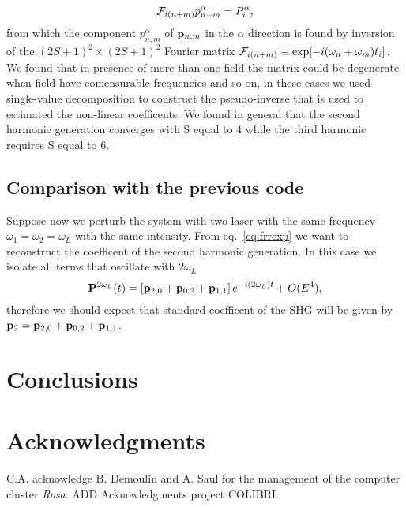 \documentclass[submission, Phys]{SciPost}
\newcommand{\pp}{{\bf p}}
\newcommand{\PP}{{\bf P}}
\newcommand{\be}{\begin{equation}}
\newcommand{\ee}{\end{equation}}
\renewcommand{\[}{\left[}
\renewcommand{\]}{\right]}
\renewcommand{\(}{\left(}
\renewcommand{\)}{\right)}
\begin{document}
\be
{\cal F}_{i(n+m)} p^\alpha_{n+m} = P^\alpha_i,
\label{eq:fouinv}
\ee 
from which the component $p^\alpha_{n,m}$ of $\pp_{n,m}$ in the $\alpha$ direction is found by inversion of the $(2S+1)^2\times(2S+1)^2$ Fourier matrix ${\cal F}_{i(n+m)} \equiv \exp[-i(\omega_n +\omega_m)t_i]$. We found that in presence of more than one field the matrix could be degenerate when field have comensurable frequencies and so on, in these cases we used single-value decomposition to construct the pseudo-inverse that is used to estimated the non-linear coefficents. We found in general that the second harmonic generation converges with S equal to 4 while the third harmonic requires S equal to 6.
\subsection{Comparison with the previous code}
Suppose now we perturb the system with two laser with the same frequency $\omega_1 = \omega_2 =\omega_L$ with the same intensity. From eq.~\ref{eq:frrexp} we want to reconstruct the coefficent of the second harmonic generation. In this case we isolate all terms that oscillate with $2\omega_L$
\be
\PP^{2\omega_L}(t) =\left [ \pp_{2,0} + \pp_{0,2} +\pp_{1,1} \right ] e^{-i(2\omega_L) t} + O(E^4),
\ee
therefore we should expect that standard coefficent of the SHG will be given by $\pp_{2}= \pp_{2,0} + \pp_{0,2} +\pp_{1,1}$.
\section{Conclusions}
\section*{Acknowledgments}
C.A. acknowledge B. Demoulin and  A. Saul for the management of the computer cluster \emph{Rosa}. ADD Acknowledgments project COLIBRI. 
%

\nolinenumbers
\end{document}
